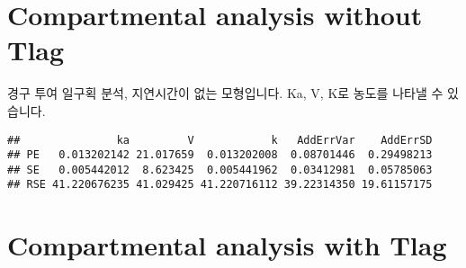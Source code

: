 \documentclass[9pt,]{krantz}
\newenvironment{Shaded}{\begin{snugshade}}{\end{snugshade}}
\newcommand{\KeywordTok}[1]{\textcolor[rgb]{0.13,0.29,0.53}{\textbf{#1}}}
\newcommand{\DataTypeTok}[1]{\textcolor[rgb]{0.13,0.29,0.53}{#1}}
\newcommand{\DecValTok}[1]{\textcolor[rgb]{0.00,0.00,0.81}{#1}}
\newcommand{\FloatTok}[1]{\textcolor[rgb]{0.00,0.00,0.81}{#1}}
\newcommand{\StringTok}[1]{\textcolor[rgb]{0.31,0.60,0.02}{#1}}
\newcommand{\CommentTok}[1]{\textcolor[rgb]{0.56,0.35,0.01}{\textit{#1}}}
\newcommand{\ControlFlowTok}[1]{\textcolor[rgb]{0.13,0.29,0.53}{\textbf{#1}}}
\newcommand{\OperatorTok}[1]{\textcolor[rgb]{0.81,0.36,0.00}{\textbf{#1}}}
\newcommand{\NormalTok}[1]{#1}
\begin{document}
\section{Compartmental analysis without
Tlag}\label{compartmental-analysis-without-tlag}

경구 투여 일구획 분석, 지연시간이 없는 모형입니다. Ka, V, K로 농도를
나타낼 수 있습니다.

\begin{Shaded}
\end{Shaded}

\begin{verbatim}
##               ka         V            k   AddErrVar    AddErrSD
## PE   0.013202142 21.017659  0.013202008  0.08701446  0.29498213
## SE   0.005442012  8.623425  0.005441962  0.03412981  0.05785063
## RSE 41.220676235 41.029425 41.220716112 39.22314350 19.61157175
\end{verbatim}

\section{Compartmental analysis with
Tlag}\label{compartmental-analysis-with-tlag}
\end{document}
